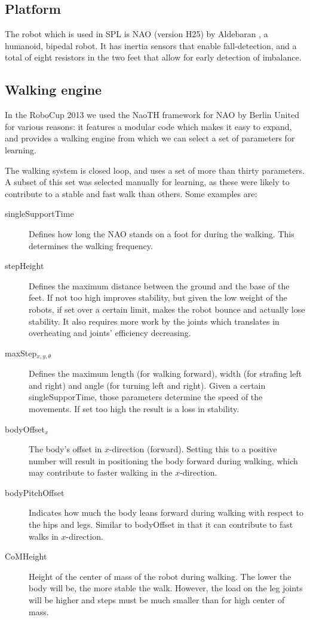\documentclass{article}
\begin{document}
\subsection{Platform}
The robot which is used in SPL is NAO (version H25) by Aldebaran
\cite{gouaillier2009mechatronic}, a humanoid, bipedal robot. It has inertia
sensors that enable fall-detection, and a total of eight resistors in the two
feet that allow for early detection of imbalance. 

\subsection{Walking engine}
In the RoboCup 2013 we used the NaoTH framework for NAO by Berlin United
\cite{naothdescription} for various reasons: it features a modular code which
makes it easy to expand, and provides a walking engine from which we can select
a set of parameters for learning. 

The walking system is closed loop, and uses a set of more than thirty parameters. A subset of this set was selected manually for learning, as these were likely to contribute to a stable and fast walk than others.
Some examples are:
\begin{description}
\item[singleSupportTime] Defines how long the NAO stands on a foot for during the walking. This determines the walking frequency.
\item[stepHeight] Defines the maximum distance between the ground and the base of the feet. If not too high improves stability, but given the low weight of the robots, if set over a certain limit, makes the robot bounce and actually lose stability. It also requires more work by the joints which translates in overheating and joints' efficiency decreasing. 
\item[maxStep$_{x,y, \theta }$] Defines the maximum length (for walking forward), width (for strafing left and right) and angle (for turning left and right). Given a certain singleSupporTime, those parameters determine the speed of the movements. If set too high the result is a loss in stability.
\item[bodyOffset$_{x}$] The body's offset in $x$-direction (forward). Setting this to a positive number will result in positioning the body forward during walking, which may contribute to faster walking in the $x$-direction.
\item[bodyPitchOffset] Indicates how much the body leans forward during walking with respect to the hips and legs. Similar to bodyOffset in that it can contribute to fast walks in $x$-direction. 
\item[CoMHeight] Height of the center of mass of the robot during walking. The lower the body will be, the more stable the walk. However, the load on the leg joints will be higher and steps must be much smaller than for high center of mass. 
\end{description}
\end{document}
